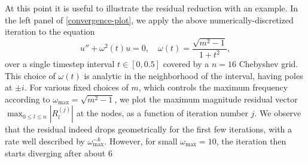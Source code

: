 \documentclass[10pt]{article}
\newcommand{\om}{\omega}
\begin{document}
At this point it is useful to illustrate the residual reduction
with an example.
In the left panel of \cref{convergence-plot}, we apply
the above numerically-discretized iteration to the
equation
\begin{equation}\label{bursteq}
  u'' + \om^2(t) u = 0, \quad  \om(t)=\frac{\sqrt{m^2 - 1}}{1+t^2},
\end{equation}
over a single timestep interval $t \in [0, 0.5]$ covered by a $n=16$ Chebyshev grid.
This choice of $\om(t)$ is analytic in the neighborhood of the interval,
having poles at $\pm i$.
%
For various fixed choices of $m$, which controls
the maximum frequency according to $\om_{\text{max}} = \sqrt{m^2-1}$,
we plot the maximum magnitude residual vector $\max_{0\le l \le n} |R_l^{(j)}|$
at the nodes, as a function of iteration number $j$.
%
We observe that the residual
indeed drops geometrically for the first few iterations,
with a rate well described by $\om_{\text{max}}^{-k}$.
However, for small $\om_{\text{max}}=10$, the iteration
then starts diverging after about $6$
\end{document}
